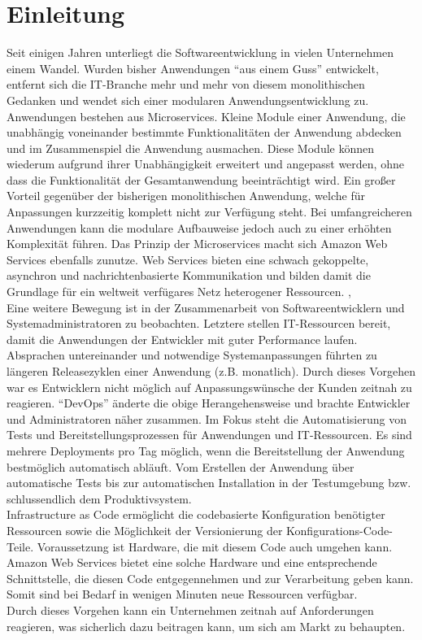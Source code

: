 \chapter*{Einleitung}
Seit einigen Jahren unterliegt die Softwareentwicklung in vielen Unternehmen einem Wandel. Wurden bisher Anwendungen "`aus einem Guss"' entwickelt, entfernt sich die IT-Branche mehr und mehr von diesem monolithischen Gedanken und wendet sich einer modularen Anwendungsentwicklung zu. Anwendungen bestehen aus Microservices. Kleine Module einer Anwendung, die unabhängig voneinander bestimmte Funktionalitäten der Anwendung abdecken und im Zusammenspiel die Anwendung ausmachen. Diese Module können wiederum aufgrund ihrer Unabhängigkeit erweitert und angepasst werden, ohne dass die Funktionalität der Gesamtanwendung beeinträchtigt wird. Ein großer Vorteil gegenüber der bisherigen monolithischen Anwendung, welche für Anpassungen kurzzeitig komplett nicht zur Verfügung steht. Bei umfangreicheren Anwendungen kann die modulare Aufbauweise jedoch auch zu einer erhöhten Komplexität führen. Das Prinzip der Microservices macht sich Amazon Web Services ebenfalls zunutze. Web Services bieten eine schwach gekoppelte, asynchron und nachrichtenbasierte Kommunikation und bilden damit die Grundlage für ein weltweit verfügares Netz heterogener Ressourcen. \cite{computerwoche:reder}, \cite{baun:cloudcomp} \\
Eine weitere Bewegung ist in der Zusammenarbeit von Softwareentwicklern und Systemadministratoren zu beobachten. Letztere stellen IT-Ressourcen bereit, damit die Anwendungen der Entwickler mit guter Performance laufen. Absprachen untereinander und notwendige Systemanpassungen führten zu längeren Releasezyklen einer Anwendung (z.B. monatlich). Durch dieses Vorgehen war es Entwicklern nicht möglich auf Anpassungswünsche der Kunden zeitnah zu reagieren. "`DevOps"' änderte die obige Herangehensweise und brachte Entwickler und Administratoren näher zusammen. Im Fokus steht die Automatisierung von Tests und Bereitstellungsprozessen für Anwendungen und IT-Ressourcen. Es sind mehrere Deployments pro Tag möglich, wenn die Bereitstellung der Anwendung bestmöglich automatisch abläuft. Vom Erstellen der Anwendung über automatische Tests bis zur automatischen Installation in der Testumgebung bzw. schlussendlich dem Produktivsystem. \\
Infrastructure as Code ermöglicht die codebasierte Konfiguration benötigter Ressourcen sowie die Möglichkeit der Versionierung der Konfigurations-Code-Teile. Voraussetzung ist Hardware, die mit diesem Code auch umgehen kann. Amazon Web Services bietet eine solche Hardware und eine entsprechende Schnittstelle, die diesen Code entgegennehmen und zur Verarbeitung geben kann. Somit sind bei Bedarf in wenigen Minuten neue Ressourcen verfügbar. \cite{wittig:awsinaction} \\
Durch dieses Vorgehen kann ein Unternehmen zeitnah auf Anforderungen reagieren, was sicherlich dazu beitragen kann, um sich am Markt zu behaupten.
